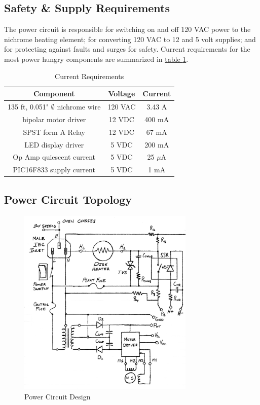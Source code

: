 \documentclass[10pt, twocolumn]{article}
\begin{document}
\subsection{Safety \& Supply Requirements}

The power circuit is responsible for switching on and off 120 VAC power
to the nichrome heating element; for converting 120 VAC to 12 and 5 volt
supplies; and for protecting against faults and surges for safety.
Current requirements for the most power hungry components are summarized in
\hyperref[current-requirements-table]{table \ref{current-requirements-table}}.

\begin{table}
	\centering
	\small
	\caption{Current Requirements}
	\begin{tabular}{c c c}
		\hline\hline
		Component					&Voltage	&Current	\\
		\hline
		135 ft, 0.051" $\emptyset$ nichrome wire	&120 VAC	&3.43 A	\\
		bipolar motor driver		&12 VDC		&400 mA	\\
		SPST form A Relay				&12 VDC		&67 mA	\\
		LED display driver				&5 VDC		&200 mA	\\
		Op Amp quiescent current			&5 VDC		&25 $\mu$A	\\
		PIC16F833 supply current			&5 VDC		&1 mA	\\
		\hline\hline
	\end{tabular}
	\label{current-requirements-table}
\end{table}

\subsection{Power Circuit Topology}

\begin{figure}
	\centering
	\includegraphics[width=0.75\textwidth]{Figures/power-circuit.pdf}
	\caption{Power Circuit Design}
	\label{power-circuit}
\end{figure}
\end{document}
